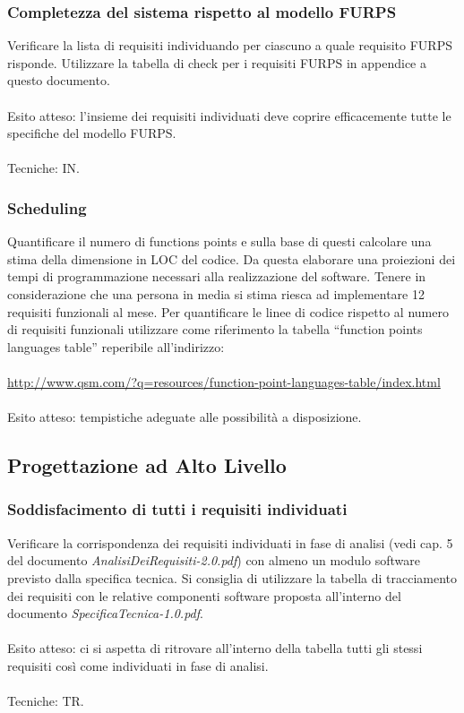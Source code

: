 \subsubsection{Completezza del sistema rispetto al modello FURPS}

Verificare la lista di requisiti individuando per ciascuno a quale requisito
FURPS risponde. Utilizzare la tabella di check per i requisiti FURPS in
appendice a questo documento.
\\\\
Esito atteso: l'insieme dei requisiti individuati deve coprire
efficacemente tutte le specifiche del modello FURPS.
\\\\ Tecniche: IN.

\subsubsection{Scheduling}

Quantificare il numero di functions points e sulla base di questi calcolare una
stima della dimensione in LOC del codice. Da questa elaborare una proiezioni dei
tempi di programmazione necessari alla realizzazione del software. Tenere in
considerazione che una persona in media si stima riesca ad implementare 12
requisiti funzionali al mese. Per quantificare le linee di codice
rispetto al numero di requisiti funzionali utilizzare come riferimento la tabella ``function points languages table'' reperibile all'indirizzo:
\\\\
\url{http://www.qsm.com/?q=resources/function-point-languages-table/index.html}
\\\\
Esito atteso: tempistiche adeguate alle possibilit\`a a disposizione.


\subsection{Progettazione ad Alto Livello}

\subsubsection{Soddisfacimento di tutti i requisiti individuati}

Verificare la corrispondenza dei requisiti individuati in fase di analisi (vedi
cap. 5 del documento \emph{AnalisiDeiRequisiti-2.0.pdf}) con almeno un modulo
software previsto dalla specifica tecnica. Si consiglia di utilizzare la tabella di tracciamento dei requisiti con le relative componenti
software proposta all'interno del documento \emph{SpecificaTecnica-1.0.pdf}.
\\\\
Esito atteso: ci si aspetta di ritrovare all'interno della tabella tutti gli
stessi requisiti cos\`i come individuati in fase di analisi.
\\\\
Tecniche: TR.
